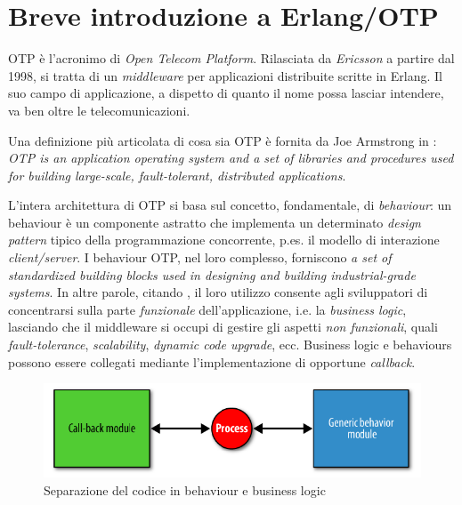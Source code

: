 %
\section{Breve introduzione a Erlang/OTP}%
OTP \`e l'acronimo di \emph{Open Telecom Platform}. Rilasciata da \emph{Ericsson} 
a partire dal 1998, si tratta di un \emph{middleware} per applicazioni distribuite 
scritte in Erlang\cite{erlang}. Il suo campo di applicazione, a dispetto di quanto 
il nome possa lasciar intendere, va ben oltre le telecomunicazioni.
%

%
Una definizione pi\`u articolata di cosa sia OTP \`e fornita da Joe Armstrong in 
\cite{armstrong07}: \emph{OTP is an application operating system and a set of libraries 
and procedures used for building large-scale, fault-tolerant, distributed applications}.
%

%
L'intera architettura di OTP si basa sul concetto, fondamentale, di \emph{behaviour}:
un behaviour \`e un componente astratto che implementa un determinato 
\emph{design pattern} tipico della programmazione concorrente, p.es. il modello di 
interazione \emph{client/server}. 
%
I behaviour OTP, nel loro complesso, forniscono \emph{a set of standardized building 
blocks used in designing and building industrial-grade systems}\cite{cesarini09}.
%
In altre parole, citando \cite{armstrong07}, il loro utilizzo consente agli sviluppatori 
di concentrarsi sulla parte \emph{funzionale} dell'applicazione, i.e. la \emph{business logic}, 
lasciando che il middleware si occupi di gestire gli aspetti \emph{non funzionali}, quali 
\emph{fault-tolerance}, \emph{scalability}, \emph{dynamic code upgrade}, ecc.
%
Business logic e behaviours possono essere collegati mediante l'implementazione di opportune 
\emph{callback}.

\begin{figure}[!h]
\centering
\includegraphics[width=400pt]{img/erl-behaviour.png}
\caption{Separazione del codice in behaviour e business logic}
\end{figure}






